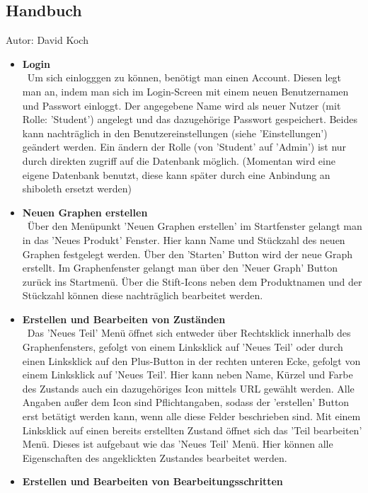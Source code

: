 \documentclass[twoside]{report}
\begin{document}
\subsection{Handbuch}
{\small Autor: David Koch}
\begin{itemize}
  \item \textbf{ Login }
    \\\
      Um sich einlogggen zu können, benötigt man einen Account. Diesen legt man an, indem man sich im Login-Screen mit einem neuen Benutzernamen und Passwort einloggt. Der angegebene Name wird als neuer Nutzer (mit Rolle: 'Student') angelegt und das dazugehörige Passwort gespeichert. Beides kann nachträglich in den Benutzereinstellungen (siehe 'Einstellungen') geändert werden. Ein ändern der Rolle (von 'Student' auf 'Admin') ist nur durch direkten zugriff auf die Datenbank möglich. (Momentan wird eine eigene Datenbank benutzt, diese kann später durch eine Anbindung an shiboleth ersetzt werden)
  \item \textbf{ Neuen Graphen erstellen }
    \\\
      Über den Menüpunkt 'Neuen Graphen erstellen' im Startfenster gelangt man in das 'Neues Produkt' Fenster. Hier kann Name und Stückzahl des neuen Graphen festgelegt werden. Über den 'Starten'  Button wird der neue Graph erstellt. Im Graphenfenster gelangt man über den 'Neuer Graph' Button zurück ins Startmenü. Über die Stift-Icons neben dem Produktnamen und der Stückzahl können diese nachträglich bearbeitet werden.
  \item \textbf{ Erstellen und Bearbeiten von Zuständen }
    \\\
      Das 'Neues Teil' Menü öffnet sich entweder über Rechtsklick innerhalb des Graphenfensters, gefolgt von einem Linksklick auf 'Neues Teil' oder durch einen Linksklick auf den Plus-Button in der rechten unteren Ecke, gefolgt von einem Linksklick auf 'Neues Teil'. Hier kann neben Name, Kürzel und Farbe des Zustands auch ein dazugehöriges Icon mittels URL gewählt werden. Alle Angaben außer dem Icon sind Pflichtangaben, sodass der 'erstellen' Button erst betätigt werden kann, wenn alle diese Felder beschrieben sind.
Mit einem Linksklick auf einen bereits erstellten Zustand öffnet sich das 'Teil bearbeiten' Menü. Dieses ist aufgebaut wie das 'Neues Teil' Menü. Hier können alle Eigenschaften des angeklickten Zustandes bearbeitet werden.
  \item \textbf{ Erstellen und Bearbeiten von Bearbeitungsschritten }
    \\\

\end{itemize}
\end{document}
